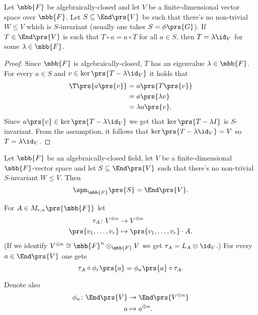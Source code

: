 \documentclass[10pt,a4paper,twoside,openany,hidelinks]{book}
\begin{document}
\begin{lemma}[Schur]
Let $\mbb{F}$ be algebraically-closed and let $V$ be a finite-dimensional vector space over $\mbb{F}$.
Let $S \subseteq \End\prs{V}$ be such that there's no non-trivial $W \leq V$ which is $S$-invariant (usually one takes $S = \phi\prs{G}$).
If $T \in \End\prs{V}$ is such that $T \circ a = a \circ T$ for all $a \in S$, then $T = \lambda \id_V$ for some $\lambda \in \mbb{F}$.
\end{lemma}

\begin{proof}
Since $\mbb{F}$ is algebraically-closed, $T$ has an eigenvalue $\lambda \in \mbb{F}$. For every $a \in S$ and $v \in \ker\prs{T - \lambda \id_V}$ it holds that
\begin{align*}
\T\prs{a\prs{v}} &= a\prs{T\prs{v}}
\\&= a\prs{\lambda v}
\\&= \lambda a\prs{v} \text{.}
\end{align*}
Since $a\prs{v} \in \ker\prs{T - \lambda \id_V}$ we get that $\ker\prs{T - \lambda I}$ is $S$-invariant. From the assumption, it follows that $\ker\prs{T - \lambda \id_V} = V$ so $T = \lambda \id_V$.
\end{proof}

\begin{theorem}\label{theorem:density}
Let $\mbb{F}$ be an algebraically-closed field, let $V$ be a finite-dimensional $\mbb{F}$-vector space and let $S \subseteq \End\prs{V}$ such that there's no non-trivial $S$-invariant $W \leq V$.
Then
\[\spn_{\mbb{F}}\prs{S} = \End\prs{V} \text{.}\]
\end{theorem}

\begin{notation}
For $A \in M_{r,n}\prs{\mbb{F}}$ let
\begin{align*}
\tau_A \colon V^{\oplus n} &\to V^{\oplus n} \\
\prs{v_1, \ldots, v_r} &\mapsto \prs{v_1, \ldots, v_r} \cdot A \text{.}
\end{align*}
(If we identify $V^{\oplus n} \cong \mbb{F}^n \otimes_{\mbb{F}} V$ we get $\tau_A = L_A \otimes \id_V$.)
For every $a \in \End\prs{V}$ one gets
\[\tau_A \circ \phi_r \prs{a} = \phi_n\prs{a} \circ \tau_A \text{.}\]

Denote also
\begin{align*}
\phi_n \colon \End\prs{V} &\to \End\prs{V^{\oplus n}} \\
a &\mapsto a^{\oplus n} \text{.}
\end{align*}
\end{notation}
\end{document}
